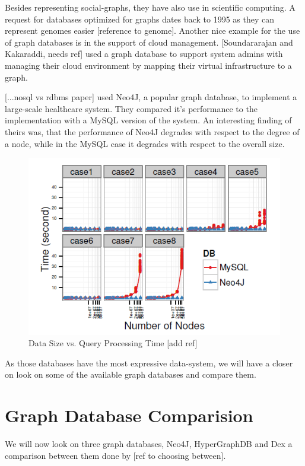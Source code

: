 \documentclass{acm_proc_article-sp}
\begin{document}
Besides representing social-graphs, they have also use in scientific computing. A request for databases optimized for graphs dates back to 1995 as they can represent genomes easier [reference to genome]. Another nice example for the use of graph databases is in the support of cloud management. [Soundararajan and Kakaraddi, needs ref] used a graph database to support system admins with managing their cloud environment by mapping their virtual infrastructure to a graph.

[...nosql vs rdbms paper] used Neo4J, a popular graph database, to implement a large-scale healthcare system. They compared it's performance to the implementation with a MySQL version of the system. An interesting finding of theirs was, that the performance of Neo4J degrades with respect to the degree of a node, while in the MySQL case it degrades with respect to the overall size.

\begin{figure}[hbtp]
	\centering
	\includegraphics[scale=0.5]{neo4j_mysql.png}
	\caption{Data Size vs. Query Processing Time [add ref]}
\end{figure}

As those databases have the most expressive data-system, we will have a closer on look on some of the available graph databases and compare them.

\section{Graph Database Comparision}

We will now look on three graph databases, Neo4J, HyperGraphDB and Dex a comparison between them done by [ref to choosing between].
\end{document}
